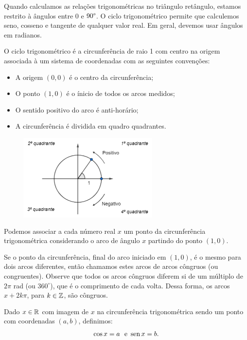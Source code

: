 Quando calculamos as relações trigonométricas no triângulo retângulo, estamos restrito à ângulos entre 0 e $90\degree$. O ciclo trigonométrico permite que calculemos seno, cosseno e tangente de qualquer valor real. Em geral, devemos usar ângulos em radianos.
 
 O ciclo trigonométrico é a circunferência de raio 1 com centro na origem associada à um sistema de coordenadas com as seguintes convenções:
 \begin{itemize}
     \item A origem $(0,0)$ é o centro da circunferência;
     \item O ponto $(1,0)$ é o ínicio de todos os arcos medidos;
     \item O sentido positivo do arco é anti-horário;
     \item A circunferência é dividida em quadro quadrantes.
 \end{itemize}
 
 \begin{figure}[H]
   \centering
   \includegraphics[width=7cm]
   {./cap_trigon/figs/ciclo_trogonometrico.png}
  \end{figure}

    Podemos associar a cada número real $x$ um ponto da circunferência trigonométrica considerando o arco de ângulo $x$ partindo do ponto $(1,0)$.

    Se o ponto da circunferência, final do arco iniciado 
 em $(1,0)$, é o mesmo para dois arcos diferentes, então chamamos estes arcos de arcos côngruos (ou congruentes). Observe que todos os arcos côngruos diferem si de um múltiplo de $2\pi$ rad (ou $360^\circ$), que é o comprimento de cada volta. Dessa forma, os arcos $x + 2k\pi$, para $k \in \mathbb{Z}$, são côngruos.


\begin{obs}
    Dado $x \in\mathbb{R}$ com imagem de $x$ na circunferência trigonométrica sendo um ponto com coordenadas $(a,b)$, definimos:
    \begin{equation*}
        \cos x = a \ \mbox{ e } \operatorname{sen} x = b.
    \end{equation*}
\end{obs}

